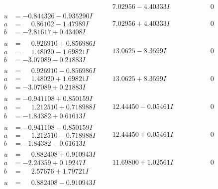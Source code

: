 \documentclass[1p]{elsarticle_modified}
\theoremstyle{definition}
\begin{document}
$$\begin{array}{c|c|c}
 & \phantom{-}7.02956 - 4.40333 I & \phantom{-0.000000 } 0 \\ \hline\begin{aligned}
u &= -0.844326 - 0.935290 I \\
a &= \phantom{-}0.86102 - 1.47989 I \\
b &= -2.81617 + 0.43408 I\end{aligned}
 & \phantom{-}7.02956 + 4.40333 I & \phantom{-0.000000 } 0 \\ \hline\begin{aligned}
u &= \phantom{-}0.926910 + 0.856986 I \\
a &= \phantom{-}1.48020 - 1.69821 I \\
b &= -3.07089 - 0.21883 I\end{aligned}
 & \phantom{-}13.0625 - 8.3599 I & \phantom{-0.000000 } 0 \\ \hline\begin{aligned}
u &= \phantom{-}0.926910 - 0.856986 I \\
a &= \phantom{-}1.48020 + 1.69821 I \\
b &= -3.07089 + 0.21883 I\end{aligned}
 & \phantom{-}13.0625 + 8.3599 I & \phantom{-0.000000 } 0 \\ \hline\begin{aligned}
u &= -0.941108 + 0.850159 I \\
a &= \phantom{-}1.212510 + 0.718988 I \\
b &= -1.84382 + 0.61613 I\end{aligned}
 & \phantom{-}12.44450 - 0.05461 I & \phantom{-0.000000 } 0 \\ \hline\begin{aligned}
u &= -0.941108 - 0.850159 I \\
a &= \phantom{-}1.212510 - 0.718988 I \\
b &= -1.84382 - 0.61613 I\end{aligned}
 & \phantom{-}12.44450 + 0.05461 I & \phantom{-0.000000 } 0 \\ \hline\begin{aligned}
u &= \phantom{-}0.882408 + 0.910943 I \\
a &= -2.24359 + 0.19247 I \\
b &= \phantom{-}2.57676 + 1.79721 I\end{aligned}
 & \phantom{-}11.69800 + 1.02561 I & \phantom{-0.000000 } 0 \\ \hline\begin{aligned}
u &= \phantom{-}0.882408 - 0.910943 I \\

\end{aligned}
\end{array}$$
\end{document}
